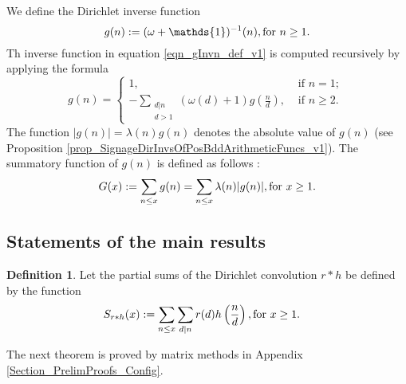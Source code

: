 \documentclass[11pt,reqno,a4letter]{article}
\newcommand{\hlocalref}[1]{\hyperref[#1]{\ref{#1}}}
\numberwithin{equation}{section}
\numberwithin{figure}{section}
\numberwithin{table}{section}
\newcommand{\seqnum}[1]{\href{http://oeis.org/#1}{\color{ProcessBlue}{\underline{#1}}}}
\theoremstyle{plain}
\numberwithin{theorem}{section}
\theoremstyle{definition}
\newtheorem{definition}[theorem]{Definition}
\theoremstyle{remark}
\newcommand{\mathtext}[1]{\text{\rm #1}}
\begin{document}
We define the Dirichlet inverse function \cite[\seqnum{A341444}]{OEIS} 
\begin{equation}
\label{eqn_gInvn_def_v1}
g(n) := (\omega + \mathds{1})^{-1}(n), \mathtext{ for } n \geq 1. 
\end{equation}
Th inverse function in equation \eqref{eqn_gInvn_def_v1} 
is computed recursively by applying the formula \cite[\S 2.7]{APOSTOLANUMT}
\[
g(n) = \begin{cases}
	1, & \text{ if $n = 1$; } \\ 
	-\sum\limits_{\substack{d|n \\ d> 1}} \left(\omega(d) + 1\right) g\left(\frac{n}{d}\right), & 
	\text{ if $n \geq 2$. }
        \end{cases}
\]
The function $|g(n)| = \lambda(n) g(n)$ denotes the absolute value of $g(n)$ 
(see Proposition \hlocalref{prop_SignageDirInvsOfPosBddArithmeticFuncs_v1}). 
The summatory function of $g(n)$ is defined as follows 
\cite[\seqnum{A341472}]{OEIS}: 
\begin{equation}
\label{eqn_GInvx_PartialSumForms_v1} 
G(x) := \sum_{n \leq x} g(n) = \sum_{n \leq x} \lambda(n) |g(n)|, \mathtext{ for } x \geq 1. 
\end{equation} 

\subsection{Statements of the main results}

\begin{definition}
Let the partial sums of the 
Dirichlet convolution $r \ast h$ be defined by the function 
\begin{align*} 
S_{r \ast h}(x) & := \sum_{n \leq x} \sum_{d|n} r(d) h\left(\frac{n}{d}\right), 
	\mathtext{ for } x \geq 1. 
\end{align*}
\end{definition}

The next theorem is proved by matrix methods in 
Appendix \hlocalref{Section_PrelimProofs_Config}.
\end{document}
